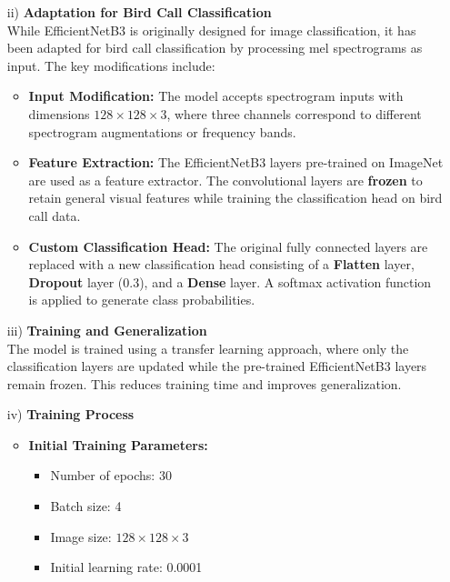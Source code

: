 \begin{itemize}
\begin{figure}[h!]
                  \label{fig:efficientNetB3}
            \end{figure}
            \newpage
      \item[ii)] \textbf{Adaptation for Bird Call Classification} \\
            While EfficientNetB3 is originally designed for image classification, it has been adapted for bird call classification by processing mel spectrograms as input. The key modifications include:
            
            \begin{itemize}
            \item \textbf{Input Modification:} The model accepts spectrogram inputs with dimensions \(128 \times 128 \times 3\), where three channels correspond to different spectrogram augmentations or frequency bands.
            \item \textbf{Feature Extraction:} The EfficientNetB3 layers pre-trained on ImageNet are used as a feature extractor. The convolutional layers are \textbf{frozen} to retain general visual features while training the classification head on bird call data.
            \item \textbf{Custom Classification Head:} The original fully connected layers are replaced with a new classification head consisting of a \textbf{Flatten} layer, \textbf{Dropout} layer (0.3), and a \textbf{Dense} layer. A softmax activation function is applied to generate class probabilities.
            \end{itemize}
            

      \item[iii)] \textbf{Training and Generalization} \\
            The model is trained using a transfer learning approach, where only the classification layers are updated while the pre-trained EfficientNetB3 layers remain frozen. This reduces training time and improves generalization.
            

      \item[iv)] \textbf{Training Process} 
            \begin{itemize}
                  \item \textbf{Initial Training Parameters:}
                  \begin{itemize}
                  \item Number of epochs: 30
                  \item Batch size: 4
                  \item Image size: \(128 \times 128 \times 3\)
                  \item Initial learning rate: 0.0001
                  \end{itemize}
            

\end{itemize}
\end{itemize}
